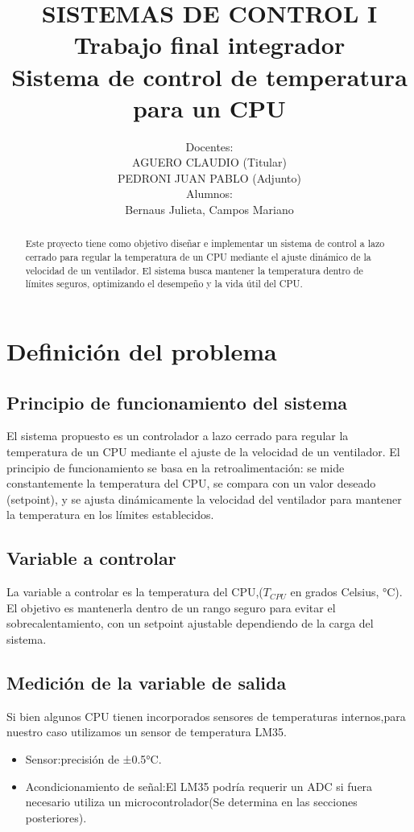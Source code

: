 \documentclass[12pt]{article}
\title{SISTEMAS DE CONTROL I \\ Trabajo final integrador 
	\\ Sistema de control de temperatura para un CPU}
\author{Docentes:\\ AGUERO CLAUDIO (Titular) \\ PEDRONI JUAN PABLO (Adjunto)
	\\ Alumnos: \\ Bernaus Julieta, Campos Mariano}
\begin{document}
	
\maketitle

\begin{abstract}
	Este proyecto tiene como objetivo diseñar e implementar un sistema de control a lazo cerrado para regular la temperatura de un CPU mediante el ajuste dinámico de la velocidad de un ventilador. El sistema busca mantener la temperatura dentro de límites seguros, optimizando el desempeño y la vida útil del CPU.
\end{abstract}\newpage

\tableofcontents \newpage

\section{Definición del problema}
	\subsection{Principio de funcionamiento del sistema}
	El sistema propuesto es un controlador a lazo cerrado para regular la temperatura de un CPU mediante el ajuste de la velocidad de un ventilador. El principio de funcionamiento se basa en la retroalimentación: se mide constantemente la temperatura del CPU, se compara con un valor deseado (setpoint), y se ajusta dinámicamente la velocidad del ventilador para mantener la temperatura en los límites establecidos.

	\subsection{Variable a controlar}
	La variable a controlar es la temperatura del CPU,($T_{CPU}$ en grados Celsius, °C). El objetivo es mantenerla dentro de un rango seguro para evitar el sobrecalentamiento, con un setpoint ajustable dependiendo de la carga del sistema.
	
	\subsection{Medición de la variable de salida}
	Si bien algunos CPU tienen incorporados sensores de temperaturas internos,para nuestro caso utilizamos un sensor de temperatura LM35.
	
	\begin{itemize}
		\item Sensor:precisión de ±0.5°C.
		\item Acondicionamiento de señal:El LM35 podría requerir un ADC si fuera necesario utiliza un microcontrolador(Se determina en las secciones posteriores).
	\end{itemize}
	
\end{document}
